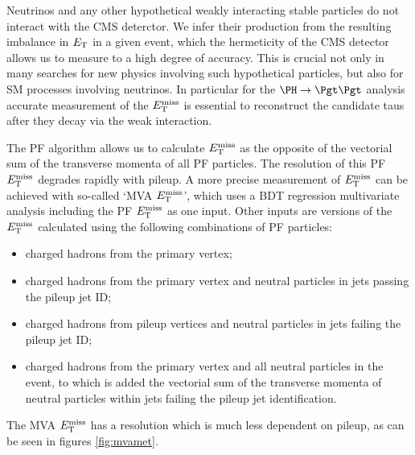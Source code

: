 Neutrinos and any other hypothetical weakly interacting stable particles do not
interact with the CMS deterctor. We infer their production from the resulting
imbalance in $E_{\mathrm{T}}$ in a given event, which the hermeticity of the CMS detector
allows us to measure to a high degree of accuracy. This is crucial not only in
many searches for new physics involving such hypothetical particles, but also for
\ac{SM} processes involving neutrinos. In particular for the $\PH \to \Pgt\Pgt$
analysis accurate measurement of the $E_{\mathrm{T}}^{\text{miss}}$ is essential to reconstruct the
candidate taus after they decay via the weak interaction.

The \ac{PF} algorithm allows us to calculate $E_{\mathrm{T}}^{\text{miss}}$ as the opposite of the vectorial sum
of the transverse momenta of all \ac{PF} particles. The resolution of this PF
$E_{\mathrm{T}}^{\text{miss}}$ degrades rapidly with pileup. A more precise
measurement of $E_{\mathrm{T}}^{\text{miss}}$ can be achieved with so-called `MVA
$E_{\mathrm{T}}^{\text{miss}}$', which uses a \ac{BDT} regression multivariate analysis
including the \ac{PF} $E_{\mathrm{T}}^{\text{miss}}$ as one input. Other inputs are versions of the
$E_{\mathrm{T}}^{\text{miss}}$ calculated using the following combinations of \ac{PF} particles: 
\begin{itemize}
\item charged hadrons from the primary vertex;
\item charged hadrons from the primary vertex and neutral particles in jets
passing the pileup jet ID;
\item charged hadrons from pileup vertices and neutral particles in jets failing
the pileup jet ID;
\item charged hadrons from the primary vertex and all neutral particles in the
event, to which is added the vectorial sum of the transverse momenta of neutral
particles within jets failing the pileup jet identification.
\end{itemize}

The MVA $E_{\mathrm{T}}^{\text{miss}}$ has a resolution which is much less
dependent on pileup, as can be seen in figures \ref{fig:mvamet}.

